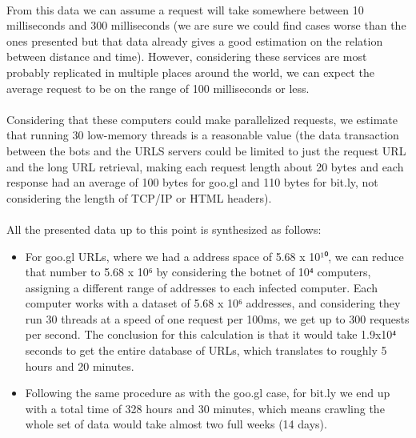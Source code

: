 \documentclass[12pt]{article}
\begin{document}
\paragraph{}
From this data we can assume a request will take somewhere between 10 milliseconds and 300 milliseconds (we are sure we could find cases worse than the ones presented but that data already gives a good estimation on the relation between distance and time). However, considering these services are most probably replicated in multiple places around the world, we can expect the average request to be on the range of 100 milliseconds or less.

\paragraph{}
Considering that these computers could make parallelized requests, we estimate that running 30 low-memory threads is a reasonable value (the data transaction between the bots and the URLS servers could be limited to just the request URL and the long URL retrieval, making each request length about 20 bytes and each response had an average of 100 bytes for goo.gl and 110 bytes for bit.ly, not considering the length of TCP/IP or HTML headers).

\paragraph{}
All the presented data up to this point is synthesized as follows:

\begin{itemize}

\item  For goo.gl URLs, where we had a address space of 5.68 x 10¹⁰, we can reduce that number to 5.68 x 10⁶ by considering the botnet of 10⁴ computers, assigning a different range of addresses to each infected computer. Each computer works with a dataset of 5.68 x 10⁶ addresses, and considering they run 30 threads at a speed of one request per 100ms, we get up to 300 requests per second. The conclusion for this calculation is that it would take 1.9x10⁴ seconds to get the entire database of URLs, which translates to roughly 5 hours and 20 minutes.

\item  Following the same procedure as with the goo.gl case, for bit.ly we end up with a total time of 328 hours and 30 minutes, which means crawling the whole set of data would take almost two full weeks (14 days).

\end{itemize}
\end{document}
